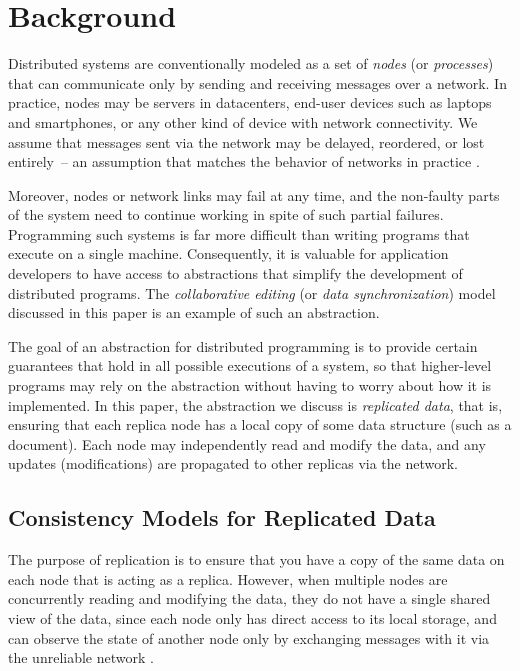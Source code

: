 \section{Background}
\label{sect.background}

Distributed systems are conventionally modeled as a set of \emph{nodes} (or \emph{processes}) that
can communicate only by sending and receiving messages over a network. In practice, nodes may be
servers in datacenters, end-user devices such as laptops and smartphones, or any other kind of
device with network connectivity. We assume that messages sent via the network may be delayed,
reordered, or lost entirely~-- an assumption that matches the behavior of networks in practice
\cite{Bailis:2014jx}.

Moreover, nodes or network links may fail at any time, and the non-faulty parts of the system need
to continue working in spite of such partial failures. Programming such systems is far more
difficult than writing programs that execute on a single machine. Consequently, it is valuable for
application developers to have access to abstractions that simplify the development of distributed
programs. The \emph{collaborative editing} (or \emph{data synchronization}) model discussed in this
paper is an example of such an abstraction.

The goal of an abstraction for distributed programming is to provide certain guarantees that hold in
all possible executions of a system, so that higher-level programs may rely on the abstraction
without having to worry about how it is implemented. In this paper, the abstraction we discuss is
\emph{replicated data}, that is, ensuring that each replica node has a local copy of some data
structure (such as a document). Each node may independently read and modify the data, and any
updates (modifications) are propagated to other replicas via the network.

\subsection{Consistency Models for Replicated Data}

The purpose of replication is to ensure that you have a copy of the same data on each node that is
acting as a replica. However, when multiple nodes are concurrently reading and modifying the data,
they do not have a single shared view of the data, since each node only has direct access to its
local storage, and can observe the state of another node only by exchanging messages with it via the
unreliable network \cite{Sheehy:2015jm}.

